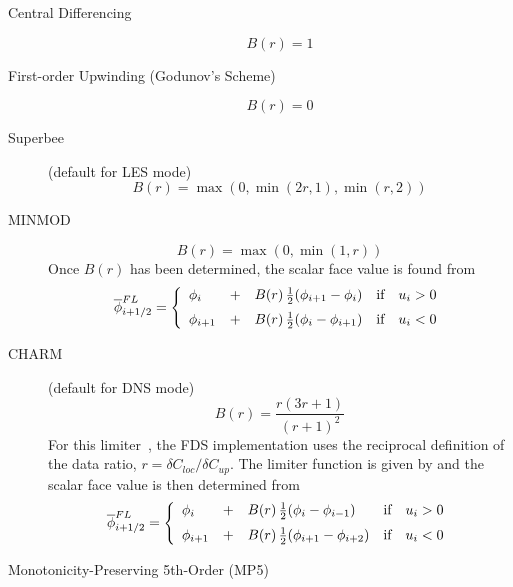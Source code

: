 \begin{description}
\item[Central Differencing]
\begin{equation} B(r) = 1 \end{equation}
\item[First-order Upwinding (Godunov's Scheme)]
\begin{equation} B(r) = 0 \end{equation}
\item[Superbee] (default for LES mode)
\begin{equation} B(r) = \max(0,\min(2r,1),\min(r,2)) \end{equation}
\item[MINMOD]
\begin{equation} B(r) = \max(0,\min(1,r)) \end{equation}
Once $B(r)$ has been determined, the scalar face value is found from
\begin{equation}
\label{eqn_flux_limiter}
\overline{\phi}^{FL}_{i+1/2} = \left\{ \begin{array}{lcll} \phi_i &+& B(r) \,\frac{1}{2}(\phi_{i+1}-\phi_i) & \mbox{if} \quad u_i>0 \vspace{0.2 cm}\\
\phi_{i+1} &+& B(r) \,\frac{1}{2}(\phi_i-\phi_{i+1}) & \mbox{if} \quad u_i<0 \end{array} \right.
\end{equation}
\item[CHARM] (default for DNS mode)
\begin{equation} B(r) = \frac{r(3r+1)}{(r+1)^2} \end{equation}
For this limiter~\cite{Zhou:1995,Kempf:2003}, the FDS implementation uses the reciprocal definition of the data ratio, $r = \delta C_{loc}/\delta C_{up}$.  The limiter function is given by and the scalar face value is then determined from
\begin{equation}
\label{eqn_charm_limiter}
\overline{\phi}^{FL}_{i+1/2} = \left\{ \begin{array}{lcll} \phi_i &+& B(r) \,\frac{1}{2}(\phi_i-\phi_{i-1}) & \mbox{if} \quad u_i>0 \vspace{0.2 cm}\\
\phi_{i+1} &+& B(r) \,\frac{1}{2}(\phi_{i+1}-\phi_{i+2}) & \mbox{if} \quad u_i<0 \end{array} \right.
\end{equation}
\item[Monotonicity-Preserving 5th-Order (MP5)]

\end{description}
